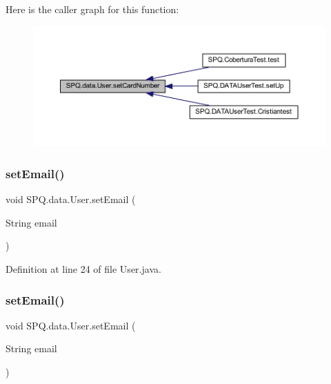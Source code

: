 Here is the caller graph for this function\+:\nopagebreak
\begin{figure}[H]
\begin{center}
\leavevmode
\includegraphics[width=350pt]{class_s_p_q_1_1data_1_1_user_a6d98a72cb61e95f5417e10e0ba80afab_icgraph}
\end{center}
\end{figure}
\mbox{\label{class_s_p_q_1_1data_1_1_user_ab7132f971882fb88afc6999cf5473ef4}} 
\subsubsection{\texorpdfstring{set\+Email()}{setEmail()}\hspace{0.1cm}{\footnotesize\ttfamily [1/4]}}
{\footnotesize\ttfamily void S\+P\+Q.\+data.\+User.\+set\+Email (\begin{DoxyParamCaption}\item[{String}]{email }\end{DoxyParamCaption})}



Definition at line 24 of file User.\+java.

\mbox{\label{class_s_p_q_1_1data_1_1_user_ab7132f971882fb88afc6999cf5473ef4}} 
\subsubsection{\texorpdfstring{set\+Email()}{setEmail()}\hspace{0.1cm}{\footnotesize\ttfamily [2/4]}}
{\footnotesize\ttfamily void S\+P\+Q.\+data.\+User.\+set\+Email (\begin{DoxyParamCaption}\item[{String}]{email }\end{DoxyParamCaption})}



